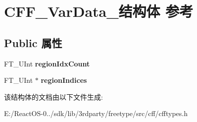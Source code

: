 \hypertarget{struct_c_f_f___var_data__}{}\section{C\+F\+F\+\_\+\+Var\+Data\+\_\+结构体 参考}
\label{struct_c_f_f___var_data__}
\subsection*{Public 属性}
\begin{DoxyCompactItemize}
\item 
\mbox{\label{struct_c_f_f___var_data___a8a6dd91ad370b0f1ab98a82dda8e1fd7}} 
F\+T\+\_\+\+U\+Int {\bfseries region\+Idx\+Count}
\item 
\mbox{\label{struct_c_f_f___var_data___a7ded2464789c65d1fc64f64972832796}} 
F\+T\+\_\+\+U\+Int $\ast$ {\bfseries region\+Indices}
\end{DoxyCompactItemize}


该结构体的文档由以下文件生成\+:\begin{DoxyCompactItemize}
\item 
E\+:/\+React\+O\+S-\/0../sdk/lib/3rdparty/freetype/src/cff/cfftypes.\+h\end{DoxyCompactItemize}
